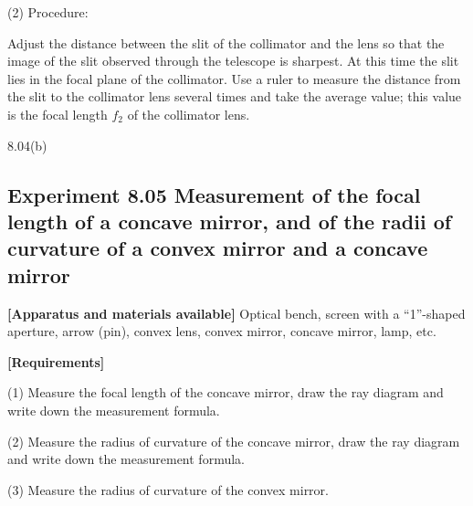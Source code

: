 (2) Procedure:

Adjust the distance between the slit of the collimator and the lens so that the image of the slit observed through the telescope is sharpest. At this time the slit lies in the focal plane of the collimator. Use a ruler to measure the distance from the slit to the collimator lens several times and take the average value; this value is the focal length $f_2$ of the collimator lens.

\begin{figbox}{8.04(b)}
\end{figbox}

\subsection*{Experiment 8.05 \quad Measurement of the focal length of a concave mirror, and of the radii of curvature of a convex mirror and a concave mirror}

\textbf{[Apparatus and materials available]} Optical bench, screen with a ``1''-shaped aperture, arrow (pin), convex lens, convex mirror, concave mirror, lamp, etc.

\textbf{[Requirements]}

(1) Measure the focal length of the concave mirror, draw the ray diagram and write down the measurement formula.

(2) Measure the radius of curvature of the concave mirror, draw the ray diagram and write down the measurement formula.

(3) Measure the radius of curvature of the convex mirror.

